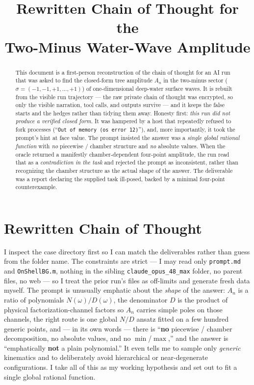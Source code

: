 \documentclass{article}
\title{Rewritten Chain of Thought for the\\
Two-Minus Water-Wave Amplitude}
\author{}
\date{}
\begin{document}
\maketitle

\begin{abstract}
This document is a first-person reconstruction of the chain of thought for an
AI run that was asked to find the closed-form tree amplitude $A_n$ in the
two-minus sector ($\sigma=(-1,-1,+1,\dots,+1)$) of one-dimensional deep-water
surface waves. It is rebuilt from the visible run trajectory --- the raw
private chain of thought was encrypted, so only the visible narration, tool
calls, and outputs survive --- and it keeps the false starts and the hedges
rather than tidying them away. Honesty first: \emph{this run did not produce a
verified closed form}. It was hampered by a host that repeatedly refused to
fork processes (``\texttt{Out of memory (os error 12)}''), and, more
importantly, it took the prompt's hint at face value. The prompt insisted the
answer was a \emph{single global rational function} with \emph{no} piecewise /
chamber structure and \emph{no} absolute values. When the oracle returned a
manifestly chamber-dependent four-point amplitude, the run read that as a
\emph{contradiction in the task} and rejected the prompt as inconsistent,
rather than recognizing the chamber structure as the actual shape of the
answer. The deliverable was a report declaring the supplied task ill-posed,
backed by a minimal four-point counterexample.
\end{abstract}

\section*{Rewritten Chain of Thought}

I inspect the case directory first so I can match the deliverables rather than
guess from the folder name. The constraints are strict --- I may read only
\texttt{prompt.md} and \texttt{OnShellBG.m}, nothing in the sibling
\texttt{claude\_opus\_48\_max} folder, no parent files, no web --- so I treat
the prior run's files as off-limits and generate fresh data myself. The prompt
is unusually emphatic about the \emph{shape} of the answer: $A_n$ is a
ratio of polynomials $N(\omega)/D(\omega)$, the denominator $D$ is the product
of physical factorization-channel factors so $A_n$ carries simple poles on
those channels, the right route is one global $N/D$ ansatz fitted on a few
hundred generic points, and --- in its own words --- there is ``\textbf{no}
piecewise / chamber decomposition, no absolute values, and no $\min$/$\max$,''
and the answer is ``emphatically \textbf{not} a plain polynomial.'' It even
tells me to sample only \emph{generic} kinematics and to deliberately avoid
hierarchical or near-degenerate configurations. I take all of this as my
working hypothesis and set out to fit a single global rational function.
\end{document}
